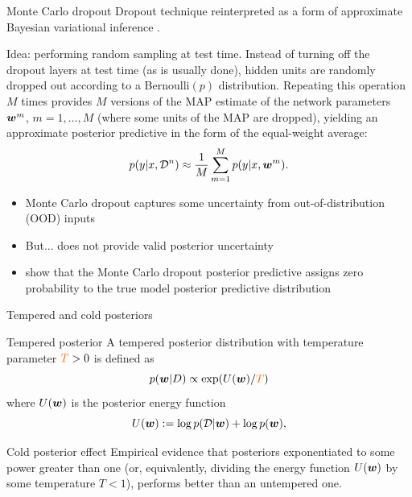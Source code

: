\documentclass[9pt]{beamer}
\begin{document}
\begin{frame}[allowframebreaks]{Monte Carlo dropout}
Dropout technique reinterpreted as a form of approximate Bayesian variational inference \citep{kingma2015variational,gal2016dropout}.

\alert{Idea}: performing random sampling at test time. Instead of turning off the dropout layers at test time (as is usually done), \textcolor{orange2}{hidden units} are randomly dropped out according to a \textcolor{orange2}{Bernoulli$(p)$} distribution. Repeating this operation $M$ times provides $M$ versions of the MAP estimate of the network parameters $\boldsymbol{w}^m$, $m=1,\ldots,M$ (where some units of the MAP are dropped), yielding an approximate posterior predictive in the form of the equal-weight average:
\begin{equation*}
	p(y\vert x, \mathcal{D}^n)\approx \frac{1}{M}\sum_{m=1}^M p(y\vert x, \boldsymbol{w}^m).
\end{equation*}

\vfill 

\begin{itemize}
	\item Monte Carlo dropout captures some uncertainty from out-of-distribution (OOD) inputs
	\item But... \alert{does not provide valid posterior uncertainty}
	\item \citet{folgoc2021mc} show that the Monte Carlo dropout posterior predictive assigns \alert{zero probability} to the true model posterior predictive distribution
\end{itemize}
\end{frame}


\begin{frame}{Tempered and cold posteriors}
\begin{block}{Tempered posterior}
	A \alert{tempered posterior distribution} with \alert{temperature parameter} $\alert{T}>0$ is defined as $$p(\bw|D) \propto \exp(U (\bw)/\alert{T} )$$ where $U(\boldsymbol{w})$ is the posterior energy function
\begin{equation*}
 U(\boldsymbol{w}) :=  \log p(\mathcal{D} | \boldsymbol{w}) + \log p(\boldsymbol{w}),
\end{equation*}
\end{block}

\pause

\begin{block}{Cold posterior effect}
Empirical evidence \citep{wenzel2020good} that posteriors  exponentiated to some power greater than one (or, equivalently, dividing the energy function $U(\boldsymbol{w})$ by some temperature $T<1$), \alert{performs better} than an untempered one.
\end{block}



\end{frame}
\end{document}
